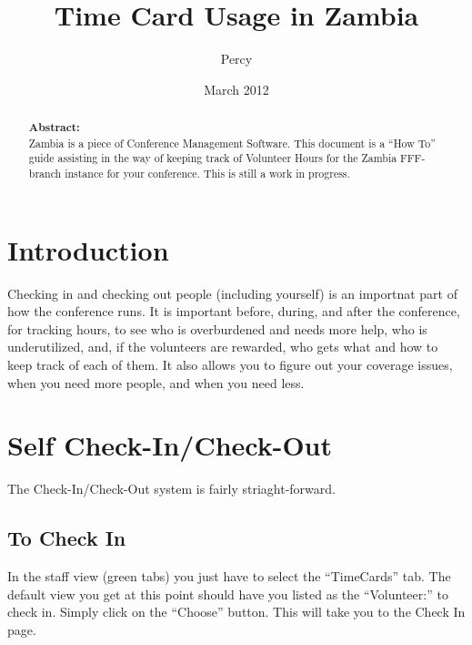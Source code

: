 \documentclass[tablesignature]{scrartcl}
\title{Time Card Usage in Zambia}
\author{Percy}
\date{March 2012}
\begin{document}
\maketitle


\thispagestyle{fancy}
\renewcommand{\headrulewidth}{0pt}
\renewcommand{\footrulewidth}{1pt}
\lhead{}
\rhead{}
\chead{}
\cfoot{}
\rfoot{\thepage}
\begin{abstract}
\vspace{5cm}
{\LARGE{\textbf{Abstract:\\}}}
Zambia is a piece of Conference Management Software.  This document is a ``How To'' guide assisting in the way of keeping track of Volunteer Hours for the Zambia FFF-branch instance for your conference.  This is still a work in progress.
\end{abstract}
\newpage
\renewcommand{\headrulewidth}{1pt}
\tableofcontents
\listoftables
\listoffigures
\newpage
{}
\section{Introduction}
\label{sec-1}


  Checking in and checking out people (including yourself) is an
  importnat part of how the conference runs.  It is important before,
  during, and after the conference, for tracking hours, to see who is
  overburdened and needs more help, who is underutilized, and, if the
  volunteers are rewarded, who gets what and how to keep track of each
  of them.  It also allows you to figure out your coverage issues,
  when you need more people, and when you need less.
\section{Self Check-In/Check-Out}
\label{sec-2}


  The Check-In/Check-Out system is fairly striaght-forward.  
\subsection{To Check In}
\label{sec-2_1}


   In the staff view (green tabs) you just have to select the
   ``TimeCards'' tab.  The default view you get at this point should
   have you listed as the ``Volunteer:'' to check in.  Simply click on
   the ``Choose'' button.  This will take you to the Check In page.
\end{document}
